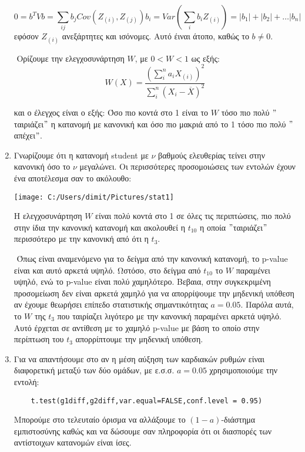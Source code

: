 \documentclass[oneside,a4paper]{article}
\newcommand {\tl}{\textlatin}
\begin{document}
\begin{enumerate}
    $$ 0 = b^T V b = \sum\limits_{ij} b_j Cov(Z_{(i)}, Z_{(j)})b_i = Var(\sum\limits_i b_i Z_{(i)}) = |b_1| + |b_2| + \ldots |b_n|$$
    εφόσον $Z_{(i)}$ ανεξάρτητες και ισόνομες. Αυτό έιναι άτοπο, καθώς το $b\neq 0$.
    
    $ $\newline
    Ορίζουμε την ελεγχοσυνάρτηση $W$, με $0 < W < 1$ ως εξής:
    $$W(X) = \frac{\left( \sum\limits_i^n a_i X_{(i)}\right)^2}{\sum\limits_i^n \left(X_i - \overline{X} \right)^2} $$
    
    και ο έλεγχος είναι ο εξής: Όσο πιο κοντά στο 1 είναι το $W$ τόσο πιο πολύ $"$ταιριάζει$"$ η κατανομή με κανονική και όσο πιο μακριά από το 1 τόσο πιο πολύ $"$απέχει$"$.

    \vspace{1cm}
    \item Γνωρίζουμε ότι η κατανομή \tl{student} με $\nu$ βαθμούς ελευθερίας τείνει στην κανονική όσο το $\nu$ μεγαλώνει. Οι περισσότερες προσομοιώσεις των εντολών έχουν ένα αποτέλεσμα σαν το ακόλουθο:
    \begin{center}
        \texttt{[image: C:/Users/dimit/Pictures/stat1]}
        \end{center}

        Η ελεγχοσυνάρτηση $W$ είναι πολύ κοντά στο 1 σε όλες τις περιπτώσεις, πιο πολύ στην ίδια την κανονική κατανομή και ακολουθεί η $t_{10}$ η οποία $"$ταιριάζει$"$ περισσότερο με την κανονική από ότι η $t_3$.
        
        $ $\newline
        Όπως είναι αναμενόμενο για το δείγμα από την κανονική κατανομή, το \tl{p-value} είναι και αυτό αρκετά υψηλό. Ωστόσο, στο δείγμα από $t_{10}$ το $W$ παραμένει υψηλό, ενώ το \tl{p-value} είναι πολύ χαμηλότερο. Βεβαια, στην συγκεκριμένη προσομείωση δεν είναι αρκετά χαμηλό για να απορρίψουμε την μηδενική υπόθεση αν έχουμε θεωρήσει επίπεδο στατιστικής σημαντικότητας $a=0.05$. Παρόλα αυτά, το $W$ της $t_3$ που ταιρίαζει λιγότερο με την κανονική παραμένει αρκετά υψηλό. Αυτό έρχεται σε αντίθεση με το χαμηλό \tl{p-value} με βάση το οποίο στην περίπτωση του $t_3$ απορρίπτουμε την μηδενική υπόθεση.

    \vspace{1cm}
    \item 
    Για να απαντήσουμε στο αν η μέση αύξηση των καρδιακών ρυθμών είναι διαφορετική μεταξύ των δύο ομάδων, με ε.σ.σ. $a=0.05$ χρησιμοποιούμε την εντολή:
    \vspace{0.1cm}
    {
    \begin{lstlisting}
    t.test(g1diff,g2diff,var.equal=FALSE,conf.level = 0.95)
    \end{lstlisting}}
    \vspace{0.1cm}
    Μπορούμε στο τελευταίο όρισμα να αλλάξουμε το $(1-a)$-διάστημα εμπιστοσύνης καθώς και να δώσουμε σαν πληροφορία ότι οι διασπορές των αντίστοιχων κατανομών είναι ίσες. 
    

\end{enumerate}
\end{document}
